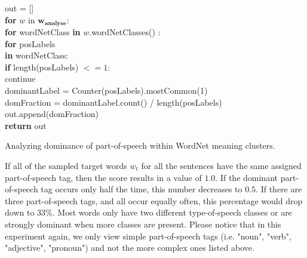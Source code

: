 \documentclass[a4paper,12pt,oneside,openright]{report}
\begin{document}
\hfill \break

\begin{algorithm}[H]
\SetAlgoLined
{}

out = [] \\

\textbf{for}  $w$ in $\mathbf{w_{\text{analyse}}}$:  \\
\quad \quad \textbf{for} wordNetClass \textbf{in} $w$.wordNetClasses() :  \\
\quad \quad \quad \textbf{for} posLabels \\
\quad \quad \quad \textbf{in} wordNetClass:  \\

\quad \quad \quad \quad \textbf{if} length(posLabels) $<= 1$: \\
\quad \quad \quad \quad \quad \quad  continue \\

\quad \quad \quad \quad dominantLabel = Counter(posLabels).mostCommon(1) \\

\quad \quad \quad \quad domFraction = dominantLabel.count() / length(posLabels) \\

\quad \quad \quad \quad out.append(domFraction) \\


\textbf{return} out
 
 \caption{Analyzing dominance of part-of-speech within WordNet meaning clusters.}
 \label{alg:dominancepos}
\end{algorithm}

\hfill \break

If all of the sampled target words $w_t$ for all the sentences have the same assigned part-of-speech tag, then the score results in a value of $1.0$.
If the dominant part-of-speech tag occurs only half the time, this number decreases to $0.5$.
If there are three part-of-speech tags, and all occur equally often, this percentage would drop down to $33\%$.
Most words only have two different type-of-speech classes or are strongly dominant when more classes are present.
Please notice that in this experiment again, we only view simple part-of-speech tags (i.e. "noun", "verb", "adjective", "pronoun") and not the more complex ones listed above.
\end{document}
